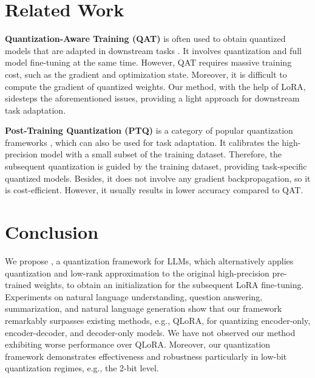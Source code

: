 \section{Related Work}
\textbf{Quantization-Aware Training (QAT)} is often used to obtain quantized models that are adapted in downstream tasks \citep{peri2020deploying, liu2023llm}. It involves quantization and full model fine-tuning at the same time. However, QAT requires massive training cost, such as the gradient and optimization state. Moreover, it is difficult to compute the gradient of quantized weights.
Our method, with the help of LoRA, sidesteps the aforementioned issues, providing a light approach for downstream task adaptation.

\vskip2pt

\noindent \textbf{Post-Training Quantization (PTQ)} is a category of popular quantization frameworks \citep{frantar2022gptq, xiao2023smoothquant}, which can also be used for task adaptation. It calibrates the high-precision model with a small subset of the training dataset. Therefore, the subsequent quantization is guided by the training dataset, providing task-specific quantized models. Besides, it does not involve any gradient backpropagation, so it is cost-efficient. However, it usually results in lower accuracy compared to QAT. 

\section{Conclusion}
We propose {\OurAlg}, a quantization framework for LLMs, which alternatively applies quantization and low-rank approximation to the original high-precision pre-trained weights, to obtain an initialization for the subsequent LoRA fine-tuning. Experiments on natural language understanding, question answering, summarization, and natural language generation show that our framework remarkably surpasses existing methods, e.g., QLoRA, for quantizing encoder-only, encoder-decoder, and decoder-only models. We have not observed our method exhibiting worse performance over QLoRA. Moreover, our quantization framework demonstrates effectiveness and robustness particularly in low-bit quantization regimes, e.g., the 2-bit level.
